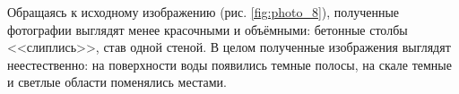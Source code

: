 Обращаясь к исходному изображению (рис. \ref{fig:photo_8}), полученные фотографии выглядят менее красочными и объёмными: бетонные столбы <<слиплись>>, став одной стеной. В целом полученные изображения выглядят неестественно: на поверхности воды появились темные полосы, на скале темные и светлые области поменялись местами.

